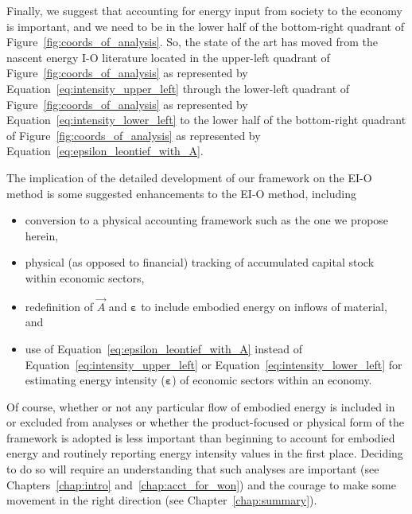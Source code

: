 Finally, we suggest that accounting for energy input from society
to the economy is important, 
and we need to be in the lower half of the bottom-right quadrant
of Figure~\ref{fig:coords_of_analysis}.
So, the state of the art has moved from the nascent energy I-O literature
located in the upper-left quadrant of Figure~\ref{fig:coords_of_analysis}
as represented by Equation~\ref{eq:intensity_upper_left}
through the lower-left quadrant of Figure~\ref{fig:coords_of_analysis}
as represented by Equation~\ref{eq:intensity_lower_left}
to the lower half of the bottom-right quadrant 
of Figure~\ref{fig:coords_of_analysis}
as represented by Equation~\ref{eq:epsilon_leontief_with_A}.

The implication of the detailed development of our framework
on the EI-O method is 
some suggested enhancements to the EI-O method, 
including

\begin{itemize}
	
	\item{conversion to a physical accounting framework such as the one we propose herein,}
	
	\item{physical (as opposed to financial) tracking 
	of accumulated capital stock within economic sectors,}
	
	\item{redefinition of $\vec{A}$ and $\boldsymbol{\varepsilon}$ to include
	embodied energy on inflows of material, and}
	
	\item{use of Equation~\ref{eq:epsilon_leontief_with_A} instead of
	Equation~\ref{eq:intensity_upper_left} or Equation~\ref{eq:intensity_lower_left}
	for estimating energy intensity ($\boldsymbol{\varepsilon}$)
	of economic sectors within an economy.}
	
\end{itemize}

Of course, whether or not any particular flow of embodied energy 
is included in or excluded from analyses 
or whether the product-focused or physical form 
of the framework is adopted
is less important than beginning to account for embodied energy
and routinely reporting energy intensity values
in the first place.
Deciding to do so will require an understanding that such analyses
are important (see Chapters~\ref{chap:intro} and~\ref{chap:acct_for_won})
and the courage to make some movement in the right direction 
(see Chapter~\ref{chap:summary}).
 

